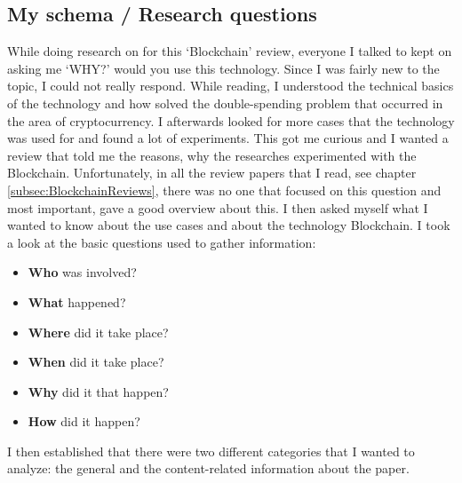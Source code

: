 \subsection{My schema / Research questions}
While doing research on for this ‘Blockchain’ review, everyone I talked to kept on asking me ‘WHY?’ would you use this technology. Since I was fairly new to the topic, I could not really respond. While reading, I understood the technical basics of the technology and how \cite{2009_Nakamoto} solved the double-spending problem that occurred in the area of cryptocurrency. I afterwards looked for more cases that the technology was used for and found a lot of experiments. This got me curious and I wanted a review that told me the reasons, why the researches experimented with the Blockchain. Unfortunately, in all the review papers that I read, see chapter \ref{subsec:BlockchainReviews}, there was no one that focused on this question and most important, gave a good overview about this. I then asked myself what I wanted to know about the use cases and about the technology Blockchain. I took a look at the basic questions used to gather information: \cite{2002_Hart}
\begin{itemize}[noitemsep]
	\item \textbf{Who} was involved?
	\item \textbf{What} happened?
	\item \textbf{Where} did it take place?
	\item \textbf{When} did it take place?
	\item \textbf{Why} did it that happen?
	\item \textbf{How} did it happen? 
\end{itemize}
I then established that there were two different categories that I wanted to analyze: the general and the content-related information about the paper.



